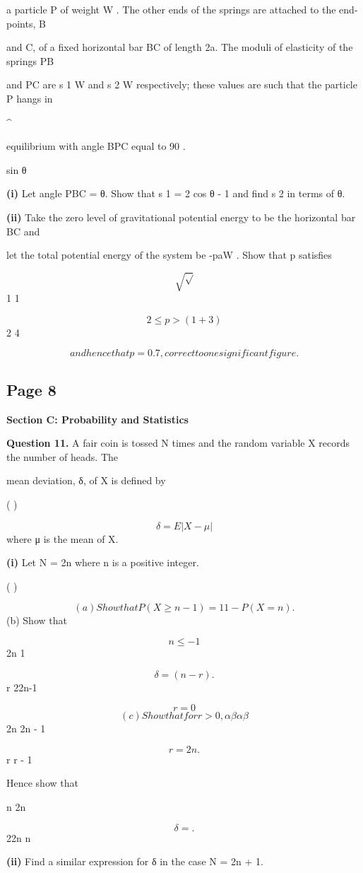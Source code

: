 \documentclass[12pt]{article}
\begin{document}
\begin{flushleft}
a particle P of weight W . The other ends of the springs are attached to the end-points, B\par
and C, of a fixed horizontal bar BC of length 2a. The moduli of elasticity of the springs PB\par
and PC are s 1 W and s 2 W respectively; these values are such that the particle P hangs in\par
\textasciicircum{}\circ\par
equilibrium with angle BPC equal to 90 .\par
sin θ\par
\textbf{(i)} Let angle PBC = θ. Show that s 1 = 2 cos θ - 1 and find s 2 in terms of θ.\par
\textbf{(ii)} Take the zero level of gravitational potential energy to be the horizontal bar BC and\par
let the total potential energy of the system be -paW . Show that p satisfies\par
\[\sqrt \sqrt\]
1 1\par
\[2 \leq p > (1 + 3)\]
2 4\par
\[and hence that p = 0.7, correct to one significant figure.\]
\end{flushleft}
\subsection*{Page 8}
\begin{flushleft}
\bigskip\textbf{Section C: Probability and Statistics}\par
\bigskip\textbf{Question 11.} A fair coin is tossed N times and the random variable X records the number of heads. The\par
mean deviation, δ, of X is defined by\par
( )\par
\[δ = E |X - μ|\]
where μ is the mean of X.\par
\textbf{(i)} Let N = 2n where n is a positive integer.\par
( )\par
\[(a) Show that P(X \geq n - 1) = 1 1 - P(X = n) .\]
(b) Show that\par
\alpha \beta\par
\[n\leq-1\]
2n 1\par
\[δ = (n - r) .\]
r 22n-1\par
\[r=0\]
\[(c) Show that for r > 0, \alpha \beta \alpha \beta\]
2n 2n - 1\par
\[r = 2n .\]
r r - 1\par
Hence show that \alpha \beta\par
n 2n\par
\[δ = .\]
22n n\par
\textbf{(ii)} Find a similar expression for δ in the case N = 2n + 1.\par
\end{flushleft}
\end{document}

